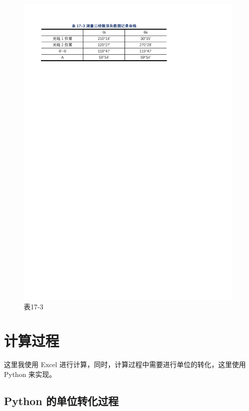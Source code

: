\documentclass[12pt]{article}
\begin{document}
\begin{figure}[H] %
    \centering
    \includegraphics[width=\textwidth]{./figures/表17-3.pdf} 
    \caption{表17-3}
    \label{fig:table_data3}
\end{figure}

\section{\normalfont 计算过程}


这里我使用 Excel 进行计算，同时，计算过程中需要进行单位的转化，这里使用 Python 来实现。

\subsection{\normalfont Python 的单位转化过程}
\end{document}
